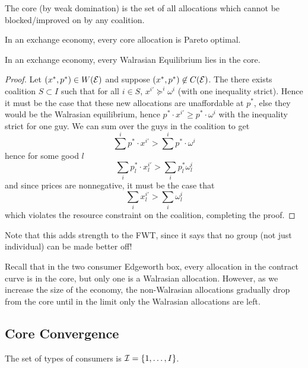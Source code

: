 \begin{definition}[Core]
  The core (by weak domination) is the set of all allocations which
  cannot be blocked/improved on by any coalition.
\end{definition}

\begin{prop}
  In an exchange economy, every core allocation is Pareto optimal.
\end{prop}

\begin{prop}
  In an exchange economy, every Walrasian Equilibrium lies in the
  core.
\end{prop}

\begin{proof}
  Let $(x^*, p^*) \in W({\cal E})$ and suppose $(x^*, p^*) \not\in
  C({\cal E})$. The there exists coalition $S \subset I$ such that for
  all $i \in S$, $x^{i'} \succeq^i \omega^i$ (with one inequality
  strict). Hence it must be the case that these new allocations are
  unaffordable at $p^*$, else they would be the Walrasian equilibrium,
  hence $p^* \cdot x^{i'} \geq p^* \cdot \omega^i$ with the inequality
  strict for one guy. We can sum over the guys in the coalition to get
  \[
  \sum^i p^* \cdot x^{i'} > \sum^i p^* \cdot \omega^i
  \]
  hence for some good $l$
  \[
  \sum_i p^*_l \cdot x^{i'}_l > \sum_i p^*_l \omega^i_l
  \]
  and since prices are nonnegative, it must be the case that
  \[
  \sum_i x^{i'}_l > \sum_i \omega^i_l
  \]
  which violates the resource constraint on the coalition, completing
  the proof.
\end{proof}

Note that this adds strength to the FWT, since it says that no group
(not just individual) can be made better off!

Recall that in the two consumer Edgeworth box, every allocation in the
contract curve is in the core, but only one is a Walrasian
allocation. However, as we increase the size of the economy, the
non-Walrasian allocations gradually drop from the core until in the
limit only the Walrasian allocations are left.

\subsection{Core Convergence}
\label{sec:core-convergence}

\begin{definition}[Type]
  The set of types of consumers is ${\cal I} = \{1, \dots, I\}$.
\end{definition}

